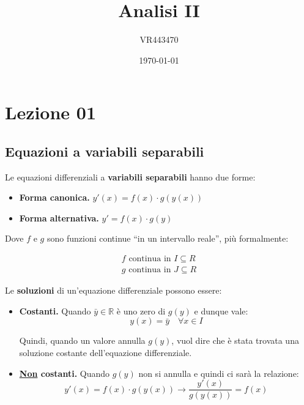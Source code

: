 \documentclass[a4paper]{article}
\begin{document}
	\author{VR443470}
	\title{Analisi II}
	\date{\printdayoff\today}
	\maketitle
	
	\newpage
	
	\tableofcontents
	
	\newpage
	
	\section{Lezione 01}
	
	\subsection{Equazioni a variabili separabili}\label{Equazioni a variabili separabili}
	
	Le equazioni differenziali a \textbf{variabili separabili} hanno due forme:
	
	\begin{itemize}
		\item \textbf{Forma canonica.} $y'(x) = f(x)\cdot g\left(y(x)\right)$
		\item \textbf{Forma alternativa.} $y' = f(x) \cdot g(y)$
	\end{itemize}
	
	\noindent
	Dove $f$ e $g$ sono funzioni continue ``in un intervallo reale'', più formalmente:
	
	\begin{gather*}
		f \text{ continua in } I \subseteq R \\
		g \text{ continua in } J \subseteq R
	\end{gather*}
	
	\noindent
	Le \textcolor{Red3}{\textbf{soluzioni}} di un'equazione differenziale possono essere:
	
	\begin{itemize}
		\item[\ding{51}] \textbf{Costanti.} Quando $\bar{y}\in\mathbb{R}$ è uno zero di $g(y)$ e dunque vale:
		\begin{equation*}
			y(x)=\bar{y} \hspace{1em} \forall x\in I
		\end{equation*}

		\noindent
		Quindi, quando un valore annulla $g(y)$, vuol dire che è stata trovata una soluzione costante dell'equazione differenziale.
		
		\item[\ding{51}] \textbf{\underline{Non} costanti.} Quando $g(y)$ non si annulla e quindi ci sarà la relazione:
		\begin{equation*}
			y'(x) = f(x) \cdot g(y(x)) \longrightarrow \dfrac{y'(x)}{g(y(x))} = f(x)
		\end{equation*}
	\end{itemize}
\end{document}
